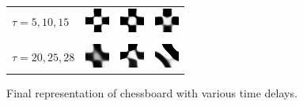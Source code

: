 \documentclass[12pt]{article}
\begin{document}
\begin{figure}%
	
	\begin{tabular}{llll}
		$\tau=5,10,15$ & \includegraphics[width=.2\linewidth,valign=m]{final_rep_tau_5} & \includegraphics[width=.2\linewidth,valign=m]{final_rep_tau_10} & \includegraphics[width=.2\linewidth,valign=m]{final_rep_tau_15}\\
		\vspace{0.1cm}\\
		$\tau=20,25,28$ & \includegraphics[width=.2\linewidth,valign=m]{final_rep_tau_20} & \includegraphics[width=.2\linewidth,valign=m]{final_rep_tau_25} & \includegraphics[width=.2\linewidth,valign=m]{final_rep_tau_28}\\
	\end{tabular}
	\caption{Final representation of chessboard with various time delays.}\centering%
	\label{fig:various_time_delays}%
\end{figure}
\end{document}
